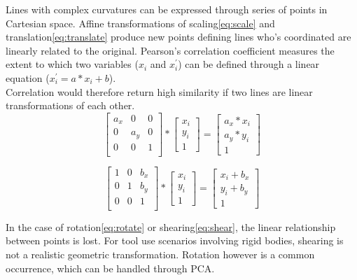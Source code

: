 \documentclass[
    floatsintext
]{article}
\begin{document}
Lines with complex curvatures can be expressed through series of points in Cartesian space. 
Affine transformations of scaling\eqref{eq:scale} and translation\eqref{eq:translate} produce new points defining lines who's coordinated are linearly related to the original. 
Pearson's correlation coefficient measures the extent to which two variables ($x_i$ and $x_i^\prime$) can be defined through a linear equation ($x_i^\prime = a * x_i + b$). \\
Correlation would therefore return high similarity if two lines are linear transformations of each other.    
\begin{equation}
  \begin{bmatrix}
    a_x & 0   & 0   \\
    0   & a_y & 0   \\
    0   & 0   &   1 \\ 
  \end{bmatrix} 
  *
  \begin{bmatrix}
    x_i \\ y_i \\ 1
  \end{bmatrix} 
  = 
  \begin{bmatrix}
    a_x * x_i \\ a_y * y_i \\ 1  
  \end{bmatrix}
  \label{eq:scale}
\end{equation}


\begin{equation}
  \begin{bmatrix}
    1 & 0 & b_x \\
    0 & 1 & b_y \\
    0 & 0 & 1   \\ 
  \end{bmatrix} 
  *
  \begin{bmatrix}
    x_i \\ y_i \\ 1
  \end{bmatrix} 
  = 
  \begin{bmatrix}
    x_i + b_x \\ y_i + b_y \\ 1  
  \end{bmatrix}
  \label{eq:translate}
\end{equation}

In the case of rotation\eqref{eq:rotate} or shearing\eqref{eq:shear}, the linear relationship between points is lost. 
For tool use scenarios involving rigid bodies, shearing is not a realistic geometric transformation. 
Rotation however is a common occurrence, which can be handled through PCA. 
\end{document}

